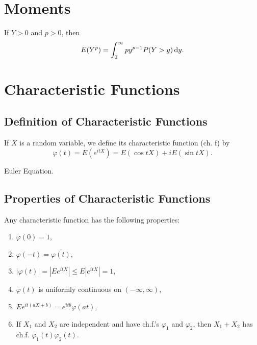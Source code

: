 \section{Moments}

\begin{lemma}
	If $Y>0$ and $p>0$, then
	\begin{equation}
		E(Y^p)=\int_{0}^{\infty}py^{p-1}P(Y>y)\mathop{}\!\mathrm{d} y.
	\end{equation}
\end{lemma}

\section{Characteristic Functions}

\subsection{Definition of Characteristic Functions}

\begin{definition} \label{def:characteristic-function}
	If $X$ is a random variable, we define its characteristic function (ch. f) by
	\begin{equation}
		\varphi(t)=E\left(e^{itX}\right)=E\left(\cos tX\right)+i E\left(\sin tX\right).
	\end{equation}
\end{definition}

\begin{remark}
	Euler Equation.
\end{remark}

\subsection{Properties of Characteristic Functions}

\begin{theorem} \label{thm:characteristic-function-property}
	Any characteristic function has the following properties:
	\begin{enumerate}
		\item $\varphi(0) = 1$,
		\item $\varphi(-t) = \overline{\varphi(t)}$,
		\item $|\varphi(t)| =|Ee^{itX}| \leq E|e^{itX}| = 1$,
		\item $\varphi(t)$ is uniformly continuous on $(-\infty,\infty)$,
		\item $Ee^{it(aX+b)}=e^{itb}\varphi(at)$,
		\item  If $X_1$ and $X_2$ are independent and have ch.f.'s $\varphi_1$ and $\varphi_2$, then $X_1+X_2$ has ch.f. $\varphi_1(t)\varphi_2(t)$.
	\end{enumerate}
\end{theorem}

